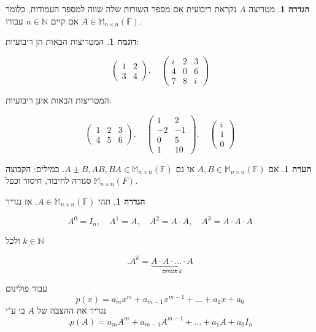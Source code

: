 \documentclass[12pt]{report}
\theoremstyle{plain}
\theoremstyle{definition}
\newtheorem{definition}[theorem]{הגדרה}
\newtheorem{example}{דוגמה}[chapter]
\newtheorem{remark}{הערה}[chapter]
\newcommand{\N}{\mathbb{N}}
\newcommand{\F}{\mathbb{F}}
\newcommand{\M}{\mathbb{M}}
\newcommand{\0}{\mathbf{0}}
\begin{document}
\begin{definition}
מטריצה 
$A$
נקראת ריבועית אם מספר השורות שלה שווה למספר העמודות, כלומר אם קיים 
$n\in\N$
עבורו
$A\in\M_{n\times n}(\F)$.
\end{definition}

\begin{example}
המטריצות הבאות הן ריבועיות:

$$
\begin{pmatrix}
1 &2 \\
3 &4
\end{pmatrix}, \quad
\begin{pmatrix}
i &2 &3 \\
4 &0 &6 \\
7 &8 &i
\end{pmatrix}
$$

המטריצות הבאות אינן ריבועיות:

$$
\begin{pmatrix}
1 &2 &3\\
4 &5 &6
\end{pmatrix}, \quad
\begin{pmatrix}
1 &2  \\
-2 &-1  \\
0 &5 \\
1 & 10
\end{pmatrix}, \quad
\begin{pmatrix}
i \\
1  \\
0 
\end{pmatrix}
$$
\end{example}

\begin{remark}
אם 
$A,B\in\M_{n\times n}(\F)$
אז גם
$A\pm B,AB,BA\in\M_{n\times n}(\F)$. 
במילים: הקבוצה 
$\M_{n\times n}(F)$
סגורה לחיבור, חיסור וכפל.
\end{remark}

\begin{definition}\label{def:matrix-polynomial}
תהי 
$A\in\M_{n\times n}(\F)$.
אז נגדיר 

$$
A^0=I_n, \quad A^1=A, \quad A^2=A\cdot A, \quad A^3=A\cdot A\cdot A
$$

ולכל
$k\in\N$

$$
.A^k = \underbrace{A \cdot A \cdot \ldots \cdot A}_{\text{פעמים} \ k}
$$

עבור פולינום
$$
p(x)=a_mx^m+a_{m-1}x^{m-1}+...+a_1x+a_0
$$
נגדיר את ההצבה של
$A$
בו ע"י
$$
.p(A)=a_mA^m+a_{m-1}A^{m-1}+...+a_1A+a_0I_n
$$
\end{definition}
\end{document}
